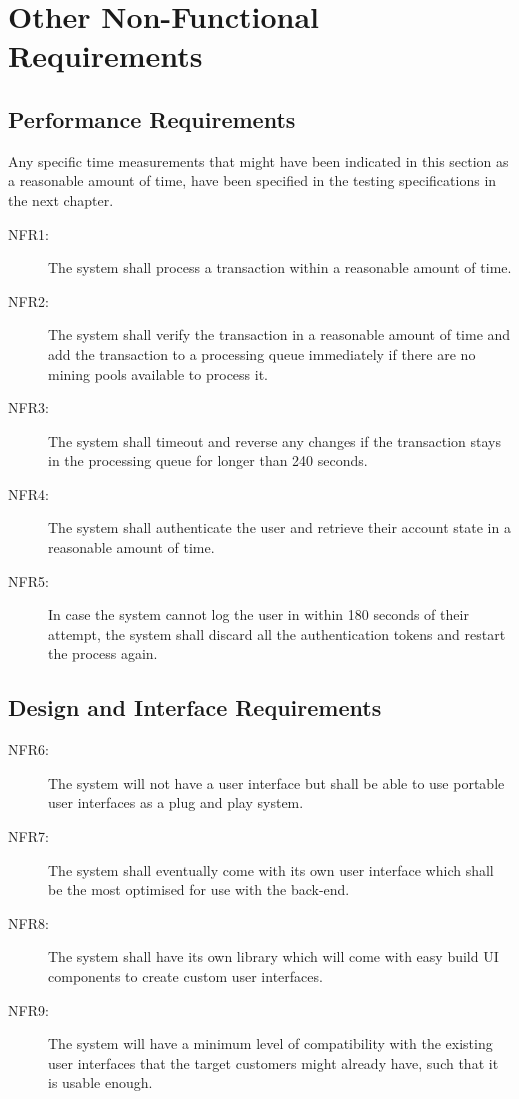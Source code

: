 \documentclass[a4paper,twoside,phd]{BYUPhys}
\begin{document}
\section{Other Non-Functional Requirements}
\subsection{Performance Requirements}
Any specific time measurements that might have been indicated in this section as a reasonable amount of time, have been specified in the testing specifications in the next chapter.
\begin{description}
\item[NFR1:] The system shall process a transaction within a reasonable amount of time.
\item[NFR2:] The system shall verify the transaction in a reasonable amount of time and add the transaction to a processing queue immediately if there are no mining pools available to process it.
\item[NFR3:] The system shall timeout and reverse any changes if the transaction stays in the processing queue for longer than 240 seconds.
\item[NFR4:] The system shall authenticate the user and retrieve their account state in a reasonable amount of time.
\item[NFR5:] In case the system cannot log the user in within 180 seconds of their attempt, the system shall discard all the authentication tokens and restart the process again.
\end{description}
\subsection{Design and Interface Requirements}
\begin{description}
\item[NFR6:] The system will not have a user interface but shall be able to use portable user interfaces as a plug and play system. 
\item[NFR7:] The system shall eventually come with its own user interface which shall be the most optimised for use with the back-end.
\item[NFR8:] The system shall have its own library which will come with easy build UI components to create custom user interfaces.
\item[NFR9:] The system will have a minimum level of compatibility with the existing user interfaces that the target customers might already have, such that it is usable enough.
\end{description}
\end{document}
